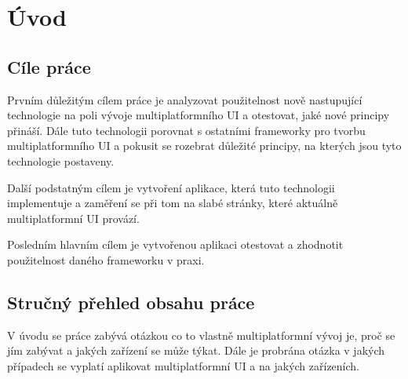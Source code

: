 \chapter{Úvod}
\setcounter{page}{1}


\section{Cíle práce} \label{goals}
Prvním důležitým cílem práce je analyzovat použitelnost nově nastupující technologie na poli vývoje multiplatformního UI a otestovat, jaké
nové principy přináší. Dále tuto technologii porovnat s ostatními frameworky pro tvorbu multiplatformního UI a pokusit se
rozebrat důležité principy, na kterých jsou tyto technologie postaveny. 

Další podstatným cílem je vytvoření aplikace, která tuto technologii implementuje a zaměření se při tom na slabé stránky, 
které aktuálně multiplatformní UI provází.

Posledním hlavním cílem je vytvořenou aplikaci otestovat a zhodnotit použitelnost daného frameworku v praxi.

\section{Stručný přehled obsahu práce}
V úvodu se práce zabývá otázkou co to vlastně multiplatformní vývoj je, proč se jím zabývat a jakých zařízení se může týkat.
Dále je probrána otázka v jakých případech se vyplatí aplikovat multiplatformní UI a na jakých zařízeních. 

